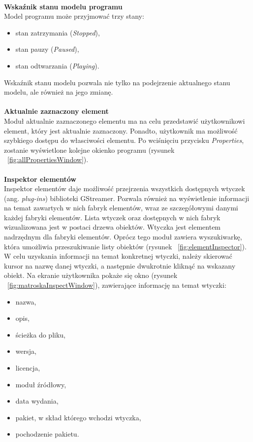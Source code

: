 \documentclass[12pt]{article}
\begin{document}
\paragraph{}\vspace{-3mm}
\textbf{Wskaźnik stanu modelu programu} \\
Model programu może przyjmować trzy stany:
\begin{itemize}
\item stan zatrzymania (\textit{Stopped}),
\item stan pauzy (\textit{Paused}),
\item stan odtwarzania (\textit{Playing}).
\end{itemize}
Wskaźnik stanu modelu pozwala nie tylko na podejrzenie aktualnego stanu modelu, ale również na jego zmianę. \paragraph{}\vspace{-3mm}
\textbf{Aktualnie zaznaczony element} \\
Moduł aktualnie zaznaczonego elementu ma na celu przedstawić użytkownikowi element, który jest aktualnie zaznaczony. Ponadto, użytkownik ma możliwość szybkiego dostępu do własciwości elementu. Po wciśnięciu przycisku \textit{Properties}, zostanie wyświetlone kolejne okienko programu (rysunek ~\ref{fig:allPropertiesWindow}). \paragraph{}\vspace{-3mm}
\textbf{Inspektor elementów} \\
Inspektor elementów daje możliwość przejrzenia wszystkich dostępnych wtyczek (ang. \textit{plug-ins}) biblioteki GStreamer. Pozwala również na wyświetlenie informacji na temat zawartych w nich fabryk elementów, wraz ze szczegółowymi danymi każdej fabryki elementów. 
Lista wtyczek oraz dostępnych w nich fabryk wizualizowana jest w postaci drzewa obiektów. Wtyczka jest elementem nadrzędnym dla fabryki elementów. Oprócz tego moduł zawiera wyszukiwarkę, która umożliwia przeszukiwanie listy obiektów (rysunek ~\ref{fig:elementInspector}).
W celu uzyskania informacji na temat konkretnej wtyczki, należy skierować kursor na nazwę danej wtyczki, a następnie dwukrotnie kliknąć na wskazany obiekt. Na ekranie użytkownika pokaże się okno (rysunek ~\ref{fig:matroskaInspectWindow}), zawierające informację na temat wtyczki:
\begin{itemize}
  \setlength{\itemsep}{0em}
\item nazwa,
\item opis,
\item ścieżka do pliku,
\item wersja,
\item licencja,
\item moduł źródłowy,
\item data wydania,
\item pakiet, w skład którego wchodzi wtyczka,
\item pochodzenie pakietu.
\end{itemize}
\end{document}
